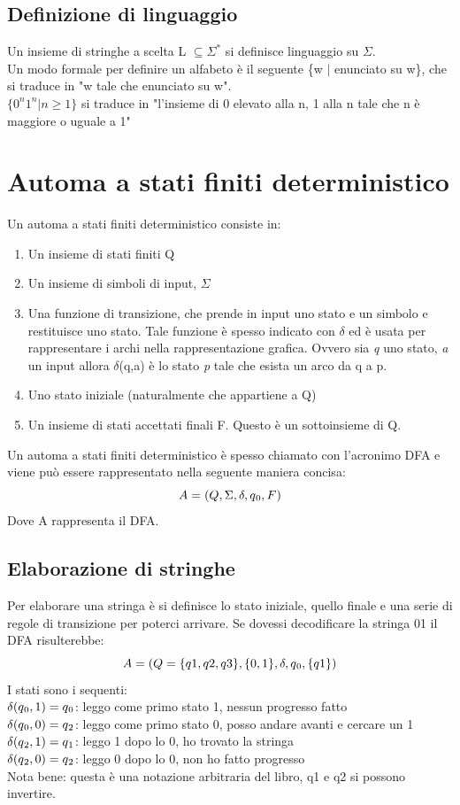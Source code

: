 \documentclass[12pt]{article}
\begin{document}
\subsection{Definizione di linguaggio}
Un insieme di stringhe a scelta L $\subseteq\Sigma^*$ si definisce linguaggio su $\Sigma$. 
\\ Un modo formale per definire un alfabeto è il seguente \{w $|$ enunciato su w\}, che si traduce in "w tale che enunciato su w".
\\ $\{0^n 1^n | n \ge 1 \}$ si traduce in "l’insieme di 0 elevato alla n, 1 alla n tale che n è maggiore o uguale a 1" 

\section{Automa a stati finiti deterministico}
Un automa a stati finiti deterministico consiste in: 
\begin{enumerate}
  \item Un insieme di stati finiti Q
  \item Un insieme di simboli di input, $\Sigma$
  \item Una funzione di transizione, che prende in input uno stato e un simbolo e restituisce uno stato. Tale funzione è spesso indicato con $\delta$ ed è usata per rappresentare i archi nella rappresentazione grafica. Ovvero sia \emph{q} uno stato, \emph{a} un input allora $\delta$(q,a) è lo stato \emph{p} tale che esista un arco da q a p.
  \item Uno stato iniziale (naturalmente che appartiene a Q)
  \item Un insieme di stati accettati finali F. Questo è un sottoinsieme di Q.
\end{enumerate}
Un automa a stati finiti deterministico è spesso chiamato con l'acronimo DFA e viene può essere rappresentato nella seguente maniera concisa: 
\[A = (Q, \Sigma, \delta, q\textsubscript{0}, F)\]
Dove A rappresenta il DFA.

\subsection{ Elaborazione di stringhe }
Per elaborare una stringa è si definisce lo stato iniziale, quello finale e una serie di regole di transizione per poterci arrivare. 
Se dovessi decodificare la stringa 01 il DFA risulterebbe: 
\[A = (Q=\{q1,q2,q3\}, \{0,1\}, \delta, q\textsubscript{0}, \{q1\})\]
I stati sono i sequenti: 
\\ $\delta(q\textsubscript{0},1)=q\textsubscript{0}$: leggo come primo stato 1, nessun progresso fatto
\\ $\delta(q\textsubscript{0},0)=q\textsubscript{2}$: leggo come primo stato 0, posso andare avanti e cercare un 1
\\ $\delta(q\textsubscript{2},1)=q\textsubscript{1}$: leggo 1 dopo lo 0, ho trovato la stringa
\\ $\delta(q\textsubscript{2},0)=q\textsubscript{2}$: leggo 0 dopo lo 0, non ho fatto progresso
\\ Nota bene: questa è una notazione arbitraria del libro, q1 e q2 si possono invertire.
\end{document}

